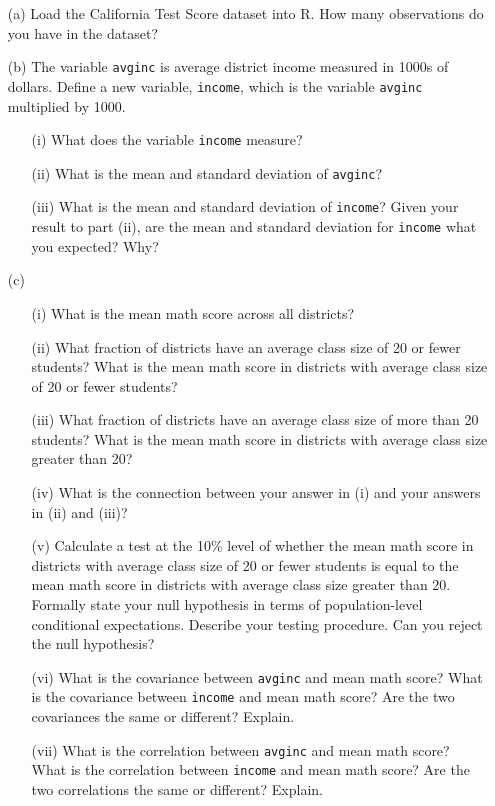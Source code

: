 \documentclass[11pt]{article}
\begin{document}
\begin{enumerate}
    \item[(a)] Load the California Test Score dataset into R. How many observations do you have in the dataset?
    \item[(b)] The variable \texttt{avginc} is average district income measured in 1000s of dollars. Define a new variable, \texttt{income}, which is the variable \texttt{avginc} multiplied by 1000.
    \begin{itemize}
        \item[(i)] What does the variable \texttt{income} measure?
        \item[(ii)] What is the mean and standard deviation of \texttt{avginc}?
        \item[(iii)] What is the mean and standard deviation of \texttt{income}? Given your result to part (ii), are the mean and standard deviation for \texttt{income} what you expected? Why?
    \end{itemize}
    \item[(c)]
    \begin{itemize}
        \item[(i)] What is the mean math score across all districts?
        \item[(ii)] What fraction of districts have an average class size of 20 or fewer students? What is the mean math score in districts with average class size of 20 or fewer students?
        \item[(iii)] What fraction of districts have an average class size of more than 20 students? What is the mean math score in districts with average class size greater than 20?
        \item[(iv)] What is the connection between your answer in (i) and your answers in (ii) and (iii)?
        \item[(v)] Calculate a test at the 10\% level of whether the mean math score in districts with average class size of 20 or fewer students is equal to the mean math score in districts with average class size greater than 20. Formally state your null hypothesis in terms of population-level conditional expectations. Describe your testing procedure. Can you reject the null hypothesis?
        \item[(vi)] What is the covariance between \texttt{avginc} and mean math score? What is the covariance between \texttt{income} and mean math score? Are the two covariances the same or different? Explain.
        \item[(vii)] What is the correlation between \texttt{avginc} and mean math score? What is the correlation between \texttt{income} and mean math score? Are the two correlations the same or different? Explain.
    \end{itemize}
\end{enumerate}
\end{document}
